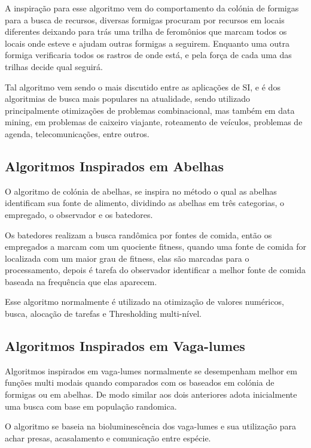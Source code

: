 \documentclass[letterpaper, 10 pt, conference]{ieeeconf}  %
\begin{document}
A inspiração para esse algoritmo vem do comportamento da colónia de formigas para a busca de recursos, diversas formigas procuram por recursos em locais diferentes deixando para trás uma trilha de feromônios que marcam todos os locais onde esteve e ajudam outras formigas a seguirem. Enquanto uma outra formiga verificaria todos os rastros de onde está, e pela força de cada uma das trilhas decide qual seguirá.

Tal algoritmo vem sendo o mais discutido entre as aplicações de SI, e é dos algoritmias de busca mais populares na atualidade, sendo utilizado principalmente otimizações de problemas combinacional, mas também em data mining, em problemas de caixeiro viajante, roteamento de veículos, problemas de agenda, telecomunicações, entre outros.
\subsection{Algoritmos Inspirados em Abelhas}

O algoritmo de colónia de abelhas, se inspira no método o qual as abelhas identificam sua fonte de alimento, dividindo as abelhas em três categorias, o empregado, o observador e os batedores.

Os batedores realizam a busca randômica por fontes de comida, então os empregados a marcam com um quociente fitness, quando uma fonte de comida for localizada com um maior grau de fitness, elas são marcadas para o processamento, depois é tarefa do observador identificar a melhor fonte de comida baseada na frequência que elas aparecem.

Esse algoritmo normalmente é utilizado na otimização de valores numéricos, busca, alocação de tarefas e Thresholding multi-nível.
\subsection{Algoritmos Inspirados em Vaga-lumes}

Algoritmos inspirados em vaga-lumes normalmente se desempenham melhor em funções multi modais quando comparados com os baseados em colónia de formigas ou em abelhas. De modo similar aos dois anteriores adota inicialmente uma busca com base em população randomica.

O algoritmo se baseia na bioluminescência dos vaga-lumes e sua utilização para achar presas, acasalamento e comunicação entre espécie.
\end{document}
